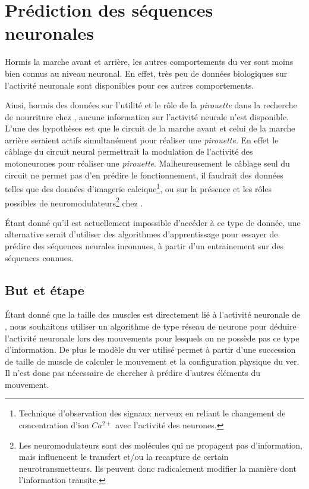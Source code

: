 \chapter{Prédiction des séquences neuronales} %
\label{cha:Prédire des séquences neuronales}

Hormis la marche avant et arrière, les autres comportements du ver sont moins
bien connus au niveau neuronal. En effet, très peu de données biologiques sur l'activité
neuronale sont disponibles pour ces autres comportements.

Ainsi, hormis des données sur l'utilité et le rôle de la \textit{pirouette}
dans la recherche de nourriture chez \celeg{}\cite{Gray2005}, aucune
information sur l'activité neurale n'est disponible. L'une des hypothèses
est que le circuit de la marche avant et celui de la marche arrière seraient
actifs simultanément pour réaliser une \textit{pirouette}. En effet le câblage
du circuit neural permettrait la modulation de l'activité des motoneurones pour
réaliser une \textit{pirouette}. Malheureusement le câblage seul du circuit ne
permet pas d'en prédire le fonctionnement, il faudrait des données telles que
des données d'imagerie calcique\footnote{Technique d'observation des signaux
nerveux en reliant le changement de concentration d'ion $Ca^{2+}$ avec
l'activité des neurones.}, ou sur la présence et les rôles possibles de
neuromodulateurs\footnote{Les neuromodulateurs sont des molécules qui ne
propagent pas d'information, mais influencent le transfert et/ou la recapture
de certain neurotransmetteurs. Ils peuvent donc radicalement modifier la
manière dont l'information transite.} chez \celeg{}.

Étant donné qu'il est actuellement impossible d'accéder à ce type de donnée, une
alternative serait d'utiliser des algorithmes d'apprentissage pour essayer de
prédire des séquences neurales inconnues, à partir d'un entrainement sur des
séquences connues.

\section{But et étape} %
\label{sec:But et étape}

Étant donné que la taille des muscles est directement lié à l'activité neuronale
de \celeg{}, nous souhaitons utiliser un algorithme de type réseau de neurone pour
déduire l'activité neuronale lors des mouvements pour lesquels on ne possède pas
ce type d'information. De plus le modèle du ver utilisé permet à partir d'une
succession de taille de muscle de calculer le mouvement et la configuration
physique du ver. Il n'est donc pas nécessaire de chercher à prédire d'autres
éléments du mouvement.


